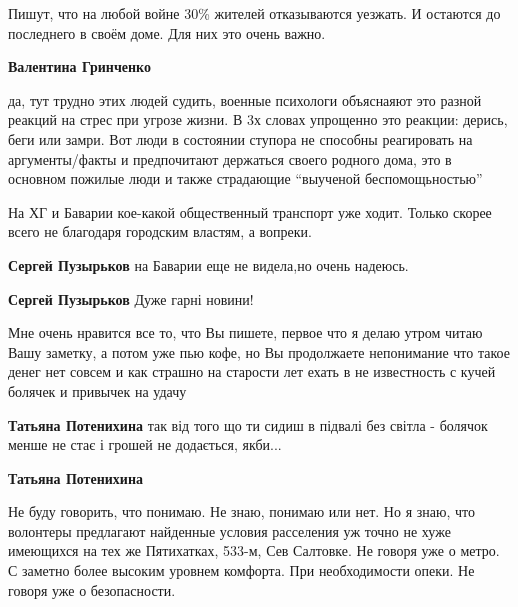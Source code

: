\begin{itemize}
\begin{itemize}
\end{itemize} %


Пишут, что на любой войне 30\% жителей отказываются уезжать. И остаются до
последнего в своём доме. Для них это очень важно.

\begin{itemize} %
\textbf{Валентина Гринченко} 

да, тут трудно этих людей судить, военные психологи объяснаяют это разной
реакций на стрес при угрозе жизни. В 3х словах упрощенно это реакции: дерись,
беги или замри. Вот люди в состоянии ступора не способны реагировать на
аргументы/факты и предпочитают держаться своего родного дома, это в основном
пожилые люди и также страдающие \enquote{выученой беспомощьностью}

\end{itemize} %


На ХГ и Баварии кое-какой общественный транспорт уже ходит. Только скорее всего
не благодаря городским властям, а вопреки.

\begin{itemize} %
\textbf{Сергей Пузырьков} на Баварии еще не видела,но очень надеюсь.

\textbf{Сергей Пузырьков} Дуже гарні новини!

\end{itemize} %


Мне очень нравится все то, что Вы пишете, первое что я делаю утром читаю Вашу
заметку, а потом уже пью кофе, но Вы продолжаете непонимание что такое денег
нет совсем и как страшно на старости лет ехать в не известность с кучей болячек
и привычек на удачу

\begin{itemize} %
\textbf{Татьяна Потенихина} так від того що ти сидиш в підвалі без світла - болячок менше не стає і грошей не додається, якби...

\textbf{Татьяна Потенихина} 

Не буду говорить, что понимаю. Не знаю, понимаю или нет. Но я знаю, что
волонтеры предлагают найденные условия расселения уж точно не хуже имеющихся на
тех же Пятихатках, 533-м, Сев Салтовке. Не говоря уже о метро. С заметно более
высоким уровнем комфорта. При необходимости опеки. Не говоря уже о
безопасности.


\end{itemize}
\end{itemize}
